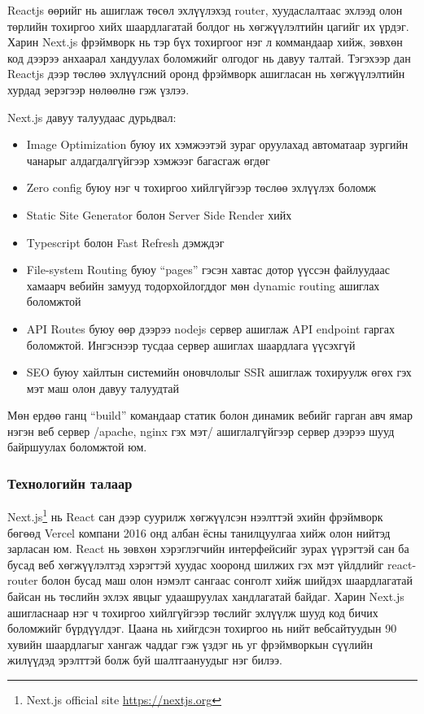Reactjs өөрийг нь ашиглаж төсөл эхлүүлэхэд router, хуудаслалтаас эхлээд олон төрлийн тохиргоо хийх шаардлагатай болдог нь хөгжүүлэлтийн цагийг их үрдэг. Харин Next.js фрэймворк нь тэр бүх тохиргоог нэг л коммандаар хийж, зөвхөн код дээрээ анхаарал хандуулах боломжийг олгодог нь давуу талтай. Тэгэхээр дан Reactjs дээр төслөө эхлүүлсний оронд фрэймворк ашигласан нь хөгжүүлэлтийн хурдад эерэгээр нөлөөлнө гэж үзлээ.

Next.js давуу талуудаас дурьдвал:
\begin{itemize}
	\item Image Optimization буюу их хэмжээтэй зураг оруулахад автоматаар зургийн чанарыг алдагдалгүйгээр хэмжээг багасгаж өгдөг
	\item Zero config буюу нэг ч тохиргоо хийлгүйгээр төслөө эхлүүлэх боломж
	\item Static Site Generator болон Server Side Render хийх
	\item Typescript болон Fast Refresh дэмждэг
	\item File-system Routing буюу “pages” гэсэн хавтас дотор үүссэн файлуудаас хамаарч вебийн замууд тодорхойлогддог мөн dynamic routing ашиглах боломжтой
	\item API Routes буюу өөр дээрээ nodejs сервер ашиглаж API endpoint гаргах боломжтой. Ингэснээр тусдаа сервер ашиглах шаардлага үүсэхгүй 
	\item SEO буюу хайлтын системийн оновчлолыг SSR ашиглаж тохируулж өгөх гэх мэт маш олон давуу талуудтай
\end{itemize}

Мөн ердөө ганц “build” командаар статик болон динамик вебийг гарган авч ямар нэгэн веб сервер /apache, nginx гэх мэт/ ашиглалгүйгээр сервер дээрээ шууд байршуулах боломжтой юм.

\subsubsection{Технологийн талаар}

Next.js\footnote{Next.js official site \url{https://nextjs.org}} нь React сан дээр суурилж хөгжүүлсэн нээлттэй эхийн фрэймворк бөгөөд Vercel компани 2016 онд албан ёсны танилцуулгаа хийж олон нийтэд зарласан юм. React нь зөвхөн хэрэглэгчийн интерфейсийг зурах үүрэгтэй сан ба бусад веб хөгжүүлэлтэд хэрэгтэй хуудас хооронд шилжих гэх мэт үйлдлийг react-router болон бусад маш олон нэмэлт сангаас сонголт хийж шийдэх шаардлагатай байсан нь төслийн эхлэх явцыг удаашруулах хандлагатай байдаг. Харин Next.js ашигласнаар нэг ч тохиргоо хийлгүйгээр төслийг эхлүүлж шууд код бичих боломжийг бүрдүүлдэг. Цаана нь хийгдсэн тохиргоо нь нийт вебсайтуудын 90 хувийн шаардлагыг хангаж чаддаг гэж үздэг нь уг фрэймворкын сүүлийн жилүүдэд эрэлттэй болж буй шалтгаануудыг нэг билээ.


